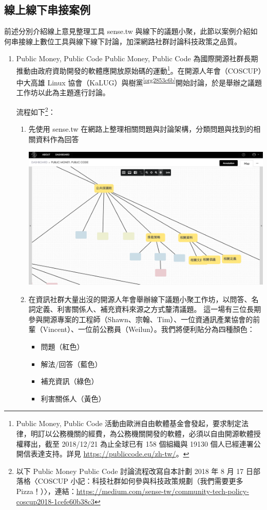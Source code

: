 \documentclass[12pt,a4paper]{article}
\begin{document}
\subsection{線上線下串接案例 }
\label{sec:orgd4f33da}
前述分別介紹線上意見整理工具 sense.tw 與線下的議題小聚，此節以案例介紹如何串接線上數位工具與線下線下討論，加深網路社群討論科技政策之品質。
\begin{enumerate}
\item Public Money, Public Code
\label{sec:orgdc15fce}
Public Money, Public Code 為國際開源社群長期推動由政府資助開發的軟體應開放原始碼的運動\footnote{Public Money, Public Code 活動由歐洲自由軟體基金會發起，要求制定法律，明訂以公務機關的經費，為公務機關開發的軟體，必須以自由開源軟體授權釋出，截至 2018/12/21 為止全球已有 158 個組織與 19130 個人已經連署公開信表達支持。詳見 \url{https://publiccode.eu/zh-tw/}。}。在開源人年會（COSCUP）中大高雄 Linux 協會（KaLUG）與樹黨\textsuperscript{\ref{org2853c6b}}開始討論，於是舉辦之議題工作坊以此為主題進行討論。

流程如下\footnote{以下 Public Money Public Code 討論流程改寫自本計劃 2018 年 8 月 17 日部落格〈COSCUP 小記：科技社群如何參與科技政策規劃（我們需要更多 Pizza！）〉，連結：\url{https://medium.com/sense-tw/community-tech-policy-coscup2018-1cefe60b38c3}}：
\begin{enumerate}
\item 先使用 sense.tw 在網路上整理相關問題與討論架構，分類問題與找到的相關資料作為回答
\begin{center}
\includegraphics[width=.9\linewidth]{./images/pmpc2.png}
\end{center}
\item 在資訊社群大量出沒的開源人年會舉辦線下議題小聚工作坊，以問答、名詞定義、利害關係人、補充資料來源之方式釐清議題。
這一場有三位長期參與開源專案的工程師（Shawn、宗翰、Tim）、一位資通訊產業協會的前輩（Vincent）、一位前公務員（Weilun）。我們將便利貼分為四種顏色：
\begin{itemize}
\item 問題（紅色）
\item 解法/回答（藍色）
\item 補充資訊（綠色）
\item 利害關係人（黃色）


\end{itemize}
\end{enumerate}
\end{enumerate}
\end{document}
